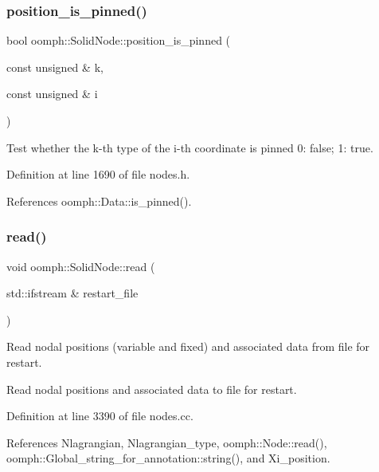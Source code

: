 \subsubsection{\texorpdfstring{position\+\_\+is\+\_\+pinned()}{position\_is\_pinned()}\hspace{0.1cm}{\footnotesize\ttfamily [2/2]}}
{\footnotesize\ttfamily bool oomph\+::\+Solid\+Node\+::position\+\_\+is\+\_\+pinned (\begin{DoxyParamCaption}\item[{const unsigned \&}]{k,  }\item[{const unsigned \&}]{i }\end{DoxyParamCaption})\hspace{0.3cm}{\ttfamily [inline]}}



Test whether the k-\/th type of the i-\/th coordinate is pinned 0\+: false; 1\+: true. 



Definition at line 1690 of file nodes.\+h.



References oomph\+::\+Data\+::is\+\_\+pinned().

\mbox{\label{classoomph_1_1SolidNode_ac4614b9f9c2222cb40cb004f85a66e57}} 
\subsubsection{\texorpdfstring{read()}{read()}}
{\footnotesize\ttfamily void oomph\+::\+Solid\+Node\+::read (\begin{DoxyParamCaption}\item[{std\+::ifstream \&}]{restart\+\_\+file }\end{DoxyParamCaption})}



Read nodal positions (variable and fixed) and associated data from file for restart. 

Read nodal positions and associated data to file for restart. 

Definition at line 3390 of file nodes.\+cc.



References Nlagrangian, Nlagrangian\+\_\+type, oomph\+::\+Node\+::read(), oomph\+::\+Global\+\_\+string\+\_\+for\+\_\+annotation\+::string(), and Xi\+\_\+position.



